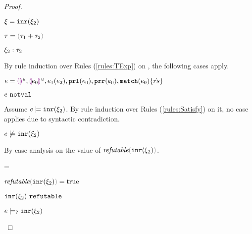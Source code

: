 \begin{proof}
\begin{byCases}
\begin{byCases}
    \end{byCases}
\item[\text{(\ref{rule:CTInr})}]
    \begin{pfsteps*}
    \item $\xi=\mathtt{inr}(\xi_2)$ 
    \item $\tau=\tsum{\tau_1}{\tau_2}$ 
    \item $\xi_2 : \tau_2$  
    \end{pfsteps*}
    By rule induction over Rules (\ref{rules:TExp}) on , the following cases apply.
    \begin{byCases}
    \item[\text{(\ref{rule:TEHole}),(\ref{rule:THole}),(\ref{rule:TAp}),(\ref{rule:TPrl}),(\ref{rule:TPrr}),(\ref{rule:TMatchZPre}),(\ref{rule:TMatchNZPre})}]
        \begin{pfsteps*}
        \item $e=\textcolor{violet}{\llparenthesis}\textcolor{violet}{\rrparenthesis}^{u},\textcolor{violet}{\llparenthesis} e_0\textcolor{violet}{\rrparenthesis}^{u},e_1(e_2),\mathtt{prl}(e_0),\mathtt{prr}(e_0),\mathtt{match}(e_0) \{\hat{rs}\}$ 
        \item $e ~\mathtt{notval}$  
        \end{pfsteps*}
        Assume $e \models \mathtt{inr}(\xi_2)$. By rule induction over Rules (\ref{rules:Satisfy}) on it, no case applies due to syntactic contradiction.
        \begin{pfsteps*}
        \item $e \not\models \mathtt{inr}(\xi_2)$  
        \end{pfsteps*}
        By case analysis on the value of $\frefutable{\cinr{\xi_2}}$.
        \begin{byCases}
        \item[\frefutable{\cinr{\xi_2}}=\true]
            \begin{pfsteps*}
            \item $\frefutable{\cinr{\xi_2}}=\true$  
            \item $\mathtt{inr}(\xi_2) ~\mathtt{refutable}$  
            \item $e \models_{?} \mathtt{inr}(\xi_2)$  

\end{pfsteps*}
\end{byCases}
\end{byCases}
\end{byCases}
\end{proof}
